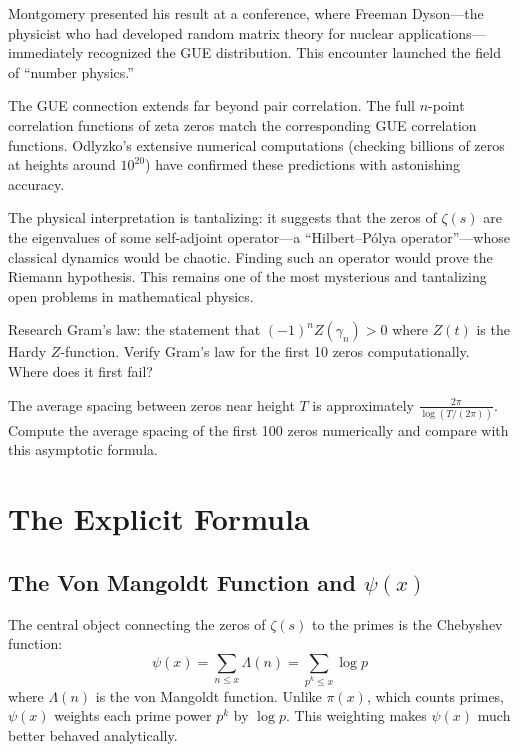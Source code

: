Montgomery presented his result at a conference, where Freeman Dyson---the physicist who had developed random matrix theory for nuclear applications---immediately recognized the GUE distribution. This encounter launched the field of ``number physics.''

The GUE connection extends far beyond pair correlation. The full $n$-point correlation functions of zeta zeros match the corresponding GUE correlation functions. Odlyzko's extensive numerical computations (checking billions of zeros at heights around $10^{20}$) have confirmed these predictions with astonishing accuracy.

The physical interpretation is tantalizing: it suggests that the zeros of $\zeta(s)$ are the eigenvalues of some self-adjoint operator---a ``Hilbert--P\'{o}lya operator''---whose classical dynamics would be chaotic. Finding such an operator would prove the Riemann hypothesis. This remains one of the most mysterious and tantalizing open problems in mathematical physics.

\begin{exercise}
\label{ex:gram}
Research Gram's law: the statement that $(-1)^n Z(\gamma_n) > 0$ where $Z(t)$ is the Hardy $Z$-function. Verify Gram's law for the first 10 zeros computationally. Where does it first fail?
\end{exercise}

\begin{exercise}
\label{ex:zero_spacing}
The average spacing between zeros near height $T$ is approximately $\frac{2\pi}{\log(T/(2\pi))}$. Compute the average spacing of the first 100 zeros numerically and compare with this asymptotic formula.
\end{exercise}

\section{The Explicit Formula}
\label{sec:explicit}

\subsection{The Von Mangoldt Function and $\psi(x)$}

The central object connecting the zeros of $\zeta(s)$ to the primes is the Chebyshev function:
\[
\psi(x) = \sum_{n \le x} \Lambda(n) = \sum_{p^k \le x} \log p
\]
where $\Lambda(n)$ is the von Mangoldt function. Unlike $\pi(x)$, which counts primes, $\psi(x)$ weights each prime power $p^k$ by $\log p$. This weighting makes $\psi(x)$ much better behaved analytically.

